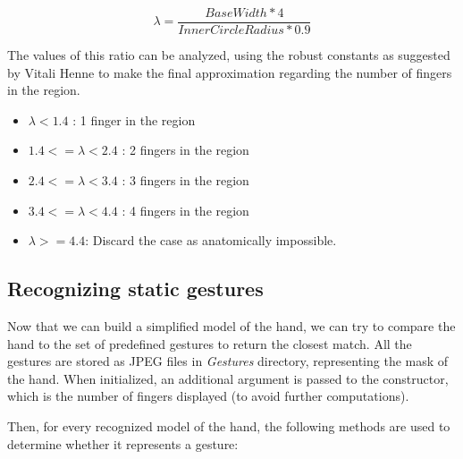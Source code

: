 \documentclass[a4paper,11pt,oneside]{article}
\begin{document}
\[\lambda = \frac{BaseWidth * 4}{InnerCircleRadius * 0.9} \]

The values of this ratio can be analyzed, using the robust constants as suggested by Vitali Henne \cite{VH01} to make the final approximation regarding the number of fingers in the region.

\begin{itemize}
\item $\lambda < 1.4$ : 1 finger in the region
\item $1.4 <= \lambda < 2.4$ : 2 fingers in the region
\item $2.4 <= \lambda < 3.4$ : 3 fingers in the region
\item $3.4 <= \lambda < 4.4$ : 4 fingers in the region
\item $\lambda >= 4.4$: Discard the case as anatomically impossible.
\end{itemize}
 
\subsection{Recognizing static gestures}
  
Now that we can build a simplified model of the hand, we can try to compare the hand to the set of predefined gestures to return the closest match. All the gestures are stored as JPEG files in \textit{Gestures} directory, representing the mask of the hand. When initialized, an additional argument is passed to the constructor, which is the number of fingers displayed (to avoid further computations).

Then, for every recognized model of the hand, the following methods are used to determine whether it represents a gesture:\\
\end{document}
